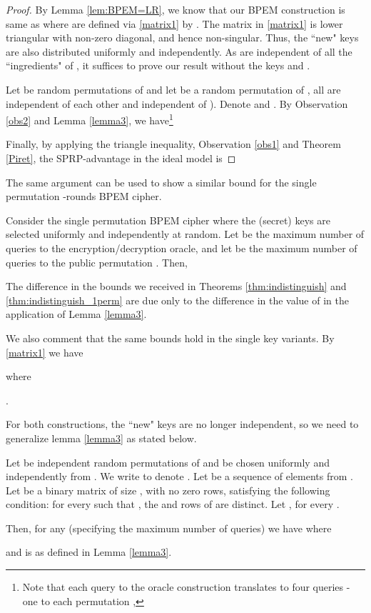 \documentclass{llncs}
\begin{document}
\begin{proof}
By Lemma \ref{lem:BPEM=LR}, we know that our BPEM construction is same as 
where  are defined via \eqref{matrix1} by . The matrix in \eqref{matrix1} is lower triangular with non-zero diagonal, and hence non-singular. Thus, the ``new" keys  are also distributed uniformly and independently. As  are independent of all the ``ingredients" of  , it suffices to prove our result without the keys  and .

Let  be random permutations of  and let  be a random permutation of , all are independent of each other and independent of
).
Denote   and  .
By Observation \ref{obs2} and Lemma \ref{lemma3}, we have\footnote{
Note that each query to the oracle construction  translates to four queries - one to each permutation
 , }

Finally, by applying the triangle inequality,  Observation \ref{obs1} and Theorem \ref{Piret}, the SPRP-advantage in the ideal model is

\end{proof}

The same argument can be used to show a similar bound for the single permutation -rounds BPEM cipher.
\begin{theorem}
\label{thm:indistinguish_1perm}
Consider the single permutation BPEM cipher  where the (secret) keys
 are selected uniformly and independently at random.
Let  be the maximum number of queries to the encryption/decryption oracle, and let  be the maximum number  of queries to the public permutation . Then,

\end{theorem}
\begin{remark}
The difference in the bounds we received in Theorems \ref{thm:indistinguish} and \ref{thm:indistinguish_1perm}  are due only to the difference in the value of  in the application of Lemma \ref{lemma3}.
\end{remark}

We also comment that the same bounds hold in the single key variants. By \eqref{matrix1} we have

where
\begin{center}
.
\end{center}

For both constructions, the ``new" keys  are no longer independent, so we need to generalize lemma \ref{lemma3} as stated below.

\begin{lemma}\label{lemma4}
Let  be independent random permutations of  and  be chosen uniformly and independently from .
We write  to denote .
Let  be a sequence of elements from .
Let  be a binary matrix of size , with no zero rows, satisfying the following condition: for every  such that , the  and  rows of  are distinct.
Let , for every  .

Then, for any  (specifying the maximum number of queries) we have
 where

and  is as defined in Lemma \ref{lemma3}.
\end{lemma}
\end{document}

